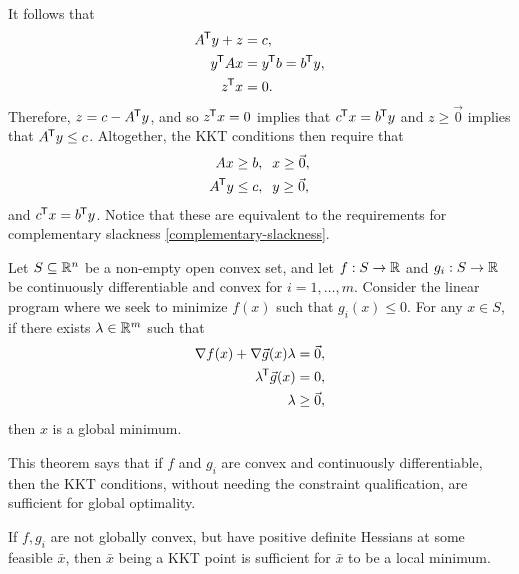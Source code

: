 \begin{exmp}
\begin{align*}
    \end{align*}
    It follows that
    \begin{align*}
        {A}^{\mkern-1.5mu\mathsf{T}}y + z &= c, \\
        {y}^{\mkern-1.5mu\mathsf{T}}Ax &= {y}^{\mkern-1.5mu\mathsf{T}}b = {b}^{\mkern-1.5mu\mathsf{T}}y, \\
        {z}^{\mkern-1.5mu\mathsf{T}}x &= 0.
    \end{align*}
    Therefore, $z = c - {A}^{\mkern-1.5mu\mathsf{T}}y$, and so ${z}^{\mkern-1.5mu\mathsf{T}}x = 0$ implies that ${c}^{\mkern-1.5mu\mathsf{T}}x = {b}^{\mkern-1.5mu\mathsf{T}}y$ and $z \geq \vec{0}$ implies that ${A}^{\mkern-1.5mu\mathsf{T}}y \leq c$. Altogether, the KKT conditions then require that
    \begin{align*}
        Ax &\geq b, \;\; x \geq \vec{0}, \\
        {A}^{\mkern-1.5mu\mathsf{T}}y &\leq c, \;\; y \geq \vec{0},
    \end{align*}
    and ${c}^{\mkern-1.5mu\mathsf{T}}x = {b}^{\mkern-1.5mu\mathsf{T}}y$. Notice that these are equivalent to the requirements for complementary slackness \ref{complementary-slackness}.
\end{exmp}

\begin{thm}\label{convex-KKT-sufficiency}
    Let $S \subseteq \mathbb{R}^n$ be a non-empty open convex set, and let $f: S \to \mathbb{R}$ and $g_i: S \to \mathbb{R}$ be continuously differentiable and convex for $i = 1, \ldots, m$. Consider the linear program where we seek to minimize $f(x)$ such that $g_i(x) \leq 0$. For any $x \in S$, if there exists $\lambda \in \mathbb{R}^m$ such that
    \begin{align*}
        \nabla f(x) + \nabla \vec{g}(x)\lambda = \vec{0}, \\
        {\lambda}^{\mkern-1.5mu\mathsf{T}}\vec{g}(x) = 0, \\
        \lambda \geq \vec{0},
    \end{align*}
    then $x$ is a global minimum.
\end{thm}

\begin{rmk}
    This theorem says that if $f$ and $g_i$ are convex and continuously differentiable, then the KKT conditions, without needing the constraint qualification, are sufficient for global optimality.
\end{rmk}

\begin{cor}
    If $f, g_i$ are not globally convex, but have positive definite Hessians at some feasible $\bar{x}$, then $\bar{x}$ being a KKT point is sufficient for $\bar{x}$ to be a local minimum.
\end{cor}
